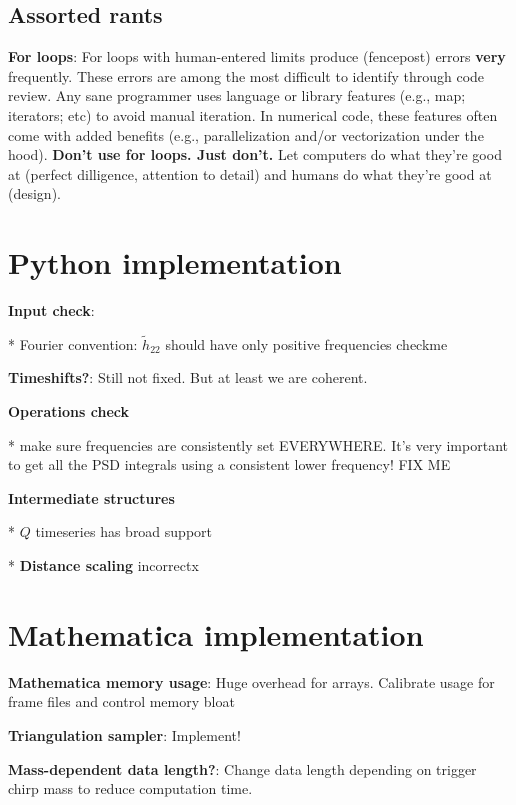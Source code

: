 \documentclass[twocolumn,prd,nofootinbib]{revtex4}
\newcommand\editremark[1]{{\color{red} #1}}
\begin{document}
\subsection{Assorted rants}

\noindent \textbf{For loops}: For loops with human-entered limits produce (fencepost) errors \textbf{very} frequently.
These errors are among the most difficult to identify through code review. 
Any sane programmer uses language or library features (e.g., map; iterators; etc) to avoid manual iteration.  In
numerical code, these features often come with added benefits (e.g., parallelization and/or vectorization under the hood).  
\textbf{Don't use for loops. Just don't.} Let computers do what they're good at (perfect dilligence, attention to
detail) and humans do what they're good at (design).

\section{Python implementation}

\noindent \textbf{Input check}: 

* Fourier convention: $\tilde{h}_{22}$ should have only positive frequencies \editremark{checkme}

\noindent \textbf{Timeshifts?}: Still not fixed. But at least we are coherent.


\noindent \textbf{Operations check}

* make sure frequencies are consistently set EVERYWHERE.  It's very important to get all the PSD integrals using a
consistent lower frequency! \editremark{FIX ME}

\noindent \textbf{Intermediate structures}



* $Q$ timeseries has broad support

* \textbf{Distance scaling} incorrectx

\section{Mathematica implementation}

\noindent \textbf{Mathematica memory usage}: Huge overhead for arrays.  Calibrate usage for frame files and control
memory bloat

\noindent \textbf{Triangulation sampler}: Implement!

\noindent \textbf{Mass-dependent data length?}: Change data length depending on trigger chirp mass to reduce computation time.
\end{document}
